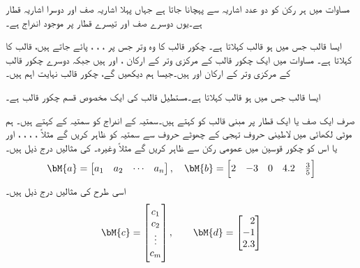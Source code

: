 مساوات  میں ہر رکن کو دو عدد اشاریہ سے پہچانا جاتا ہے جہاں پہلا اشاریہ صف اور دوسرا اشاریہ قطار ہے۔یوں  دوسرے صف اور تیسرے قطار پر موجود اندراج ہے۔

ایسا قالب جس میں  ہو   قالب کہلاتا ہے۔ چکور قالب کا وہ وتر جس پر ، ، ،  پائے جاتے ہیں، قالب کا  کہلاتا ہے۔ مساوات  میں ایک چکور قالب کے مرکزی وتر کے ارکان ،  اور  ہیں جبکہ دوسرے چکور قالب کے مرکزی وتر کے ارکان  اور  ہیں۔جیسا ہم دیکھیں گے، چکور قالب نہایت اہم ہیں۔

ایسا قالب جس میں  ہو   قالب کہلاتا ہے۔مستطیل قالب کی ایک مخصوص قسم چکور قالب ہے۔

صرف ایک صف یا ایک قطار پر مبنی قالب کو  کہتے ہیں۔سمتیہ کے اندراج کو سمتیہ کے  کہتے ہیں۔ ہم موٹی لکھائی میں لاطینی حروف تہجی  کے چھوٹے حروف سے سمتیہ کو ظاہر کریں گے مثلاً ، ، ، ، اور یا اس کو   چکور قوسین میں عمومی رکن سے ظاہر کریں گے مثلاً  وغیرہ۔  کی مثالیں درج ذیل ہیں۔
\begin{align*}
\bM{a}=
\begin{bmatrix}
a_1& a_2 & \cdots & a_n
\end{bmatrix}, \quad 
\bM{b}=
\begin{bmatrix}
2& -3&0& 4.2& \tfrac{3}{5} 
\end{bmatrix}
\end{align*}
اسی طرح  کی مثالیں درج ذیل ہیں۔
\begin{align*}
\bM{c}=
\begin{bmatrix}
c_1\\
c_2\\
\vdots\\
c_m
\end{bmatrix}, \quad \quad
\bM{d}=
\begin{bmatrix*}[r]
2\\
-1\\
2.3
\end{bmatrix*}
\end{align*}


